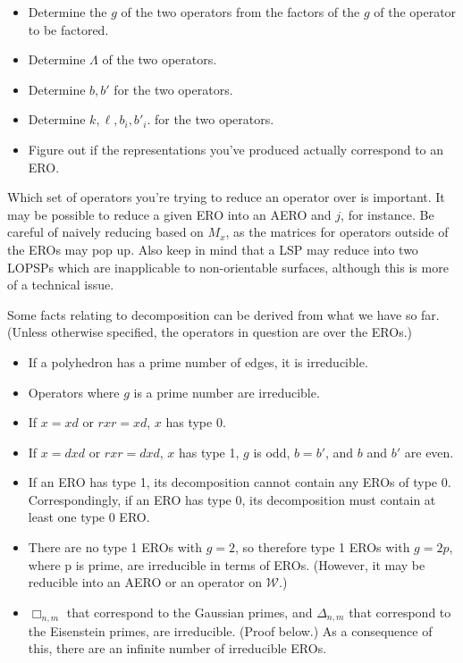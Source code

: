 \documentclass{amsart}[12pt]
\begin{document}
\begin{itemize}
  \item Determine the $g$ of the two operators from the factors of the
    $g$ of the operator to be factored.
  \item Determine $\Lambda$ of the two operators.
  \item Determine $b, b'$ for the two operators.
  \item Determine $k, \ell, b_i, b'_i$. for the two operators.
  \item Figure out if the representations you've produced
    actually correspond to an ERO.
\end{itemize}

Which set of operators you're trying to reduce an operator over is important.
It may be possible to reduce a given ERO into an AERO and $j$, for instance.
Be careful of naively reducing based on $M_x$, as the matrices for operators
outside of the EROs may pop up. Also keep in mind that a LSP may reduce into
two LOPSPs which are inapplicable to non-orientable surfaces, although this is
more of a technical issue.

Some facts relating to decomposition can be derived from what we have
so far.
(Unless otherwise specified, the operators in question are over the EROs.)

\begin{itemize}
\item If a polyhedron has a prime number of edges, it is irreducible.
\item Operators where $g$ is a prime number are irreducible.
\item If $x=xd$ or $rxr=xd$, $x$ has type 0.
\item If $x=dxd$ or $rxr=dxd$, $x$ has type 1, $g$ is odd, $b=b'$,
and $b$ and $b'$ are even.
\item If an ERO has type 1, its decomposition cannot contain
any EROs of type 0. Correspondingly, if an ERO has type 0,
its decomposition must contain at least one type 0 ERO.
\item There are no type 1 EROs with $g=2$, so therefore type 1 EROs
  with $g=2p$, where p is prime, are irreducible in terms of EROs.
  (However, it may be reducible into an AERO or an operator on $\mathcal{W}$.)
\item $\Box_{n,m}$ that correspond to the Gaussian primes,
  and $\Delta_{n,m}$ that correspond to the Eisenstein primes,
  are irreducible. (Proof below.)
  As a consequence of this, there are an infinite number of irreducible EROs.
\end{itemize}
\end{document}

